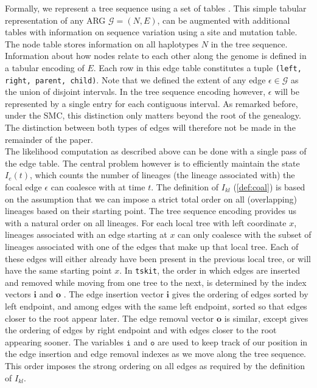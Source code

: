 \documentclass{article}
\begin{document}
Formally, we represent a tree sequence using a set of tables \citep{kelleher_efficient_2018}. 
This simple tabular representation of any ARG $\mathcal{G} = (N, E)$, can be 
augmented with additional tables with information on sequence variation
using a site and mutation table. The node table stores information on all 
haplotypes $N$ in the tree sequence. Information about how nodes relate to 
each other along the genome is defined in a tabular encoding of $E$.
Each row in this edge table constitutes a tuple \texttt{(left, right, parent, child)}.
Note that we defined the extent of any edge $\epsilon \in \mathcal{G}$ as the union of 
disjoint intervals. In the tree sequence encoding however, $\epsilon$ will be represented 
by a single entry for each contiguous interval. As remarked before, under the SMC, this 
distinction only matters beyond the root of the genealogy. The distinction between both 
types of edges will therefore not be made in the remainder of the paper.
\\

The likelihood computation as described above can be done with a single pass 
of the edge table.
The central problem however is to efficiently maintain the state $I_e(t)$, which counts 
the number of lineages (the lineage associated with) the focal edge $\epsilon$ can coalesce 
with at time $t$. 
The definition of $I_{kl}$ (\ref{def:coal}) is based on the assumption 
that we can impose a strict total order on all (overlapping) lineages based on their 
starting point. The tree sequence encoding provides us with a natural order on all lineages.  
For each local tree with left coordinate $x$, lineages associated with an edge 
starting at $x$ can only coalesce with the subset of lineages associated with one of the
edges that make up that local tree. Each of these edges will either already have 
been present in the previous local tree, or will have the same starting point $x$.
In \texttt{tskit}, the order in which edges are inserted and removed 
while moving from one tree to the next, is determined by the index 
vectors $\textbf{i}$ and $\textbf{o}$ \citep{kelleher_efficient_2016}.
The edge insertion vector $\textbf{i}$ gives the ordering of edges sorted by left 
endpoint, and among edges with the same left endpoint, sorted so that edges closer 
to the root appear later. The edge removal vector $\textbf{o}$ is similar, 
except gives the ordering of edges by right endpoint and with edges closer to the 
root appearing sooner. The variables $\texttt{i}$ and 
$\texttt{o}$ are used to keep track of our position in the edge insertion and edge removal 
indexes as we move along the tree sequence. This order imposes the 
strong ordering on all edges as required by the definition of $I_{kl}$.\\
\end{document}
